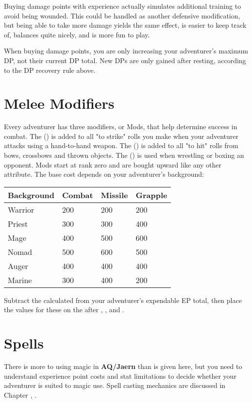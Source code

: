 \begin{multicols*}{2}
Buying damage points with experience actually simulates additional training to avoid being wounded. This could be handled as another defensive modification, but being able to take more damage yields the same effect, is easier to keep track of, balances quite nicely, and is more fun to play.

When buying damage points, you are only increasing your adventurer's maximum DP, not their current DP total. New DPs are only gained after resting, according to the DP recovery rule above.
\section{Melee Modifiers}
Every adventurer has three modifiers, or Mods, that help determine success in combat. The  (\CM) is added to all  "to strike" rolls you make when your adventurer attacks using a hand-to-hand weapon. The  (\MM) is added to all "to hit" rolls from bows, crossbows and thrown objects. The  (\GM) is used when wrestling or boxing an opponent. Mods start at rank zero and are bought upward like any other attribute. The base cost depends on your adventurer's background:

\begin{normbox}
\begin{tabular}{l l l l}
\small
\textbf{Background} & \textbf{Combat} & \textbf{Missile} & \textbf{Grapple}\\
\midrule
Warrior & 200 & 200 & 200\\
Priest & 300 & 300 & 400\\
Mage & 400 & 500 & 600\\
Nomad & 500 & 600 & 500\\
Auger & 400 & 400 & 400\\
Marine & 300 & 400 & 200\\
\end{tabular}
\end{normbox}
\normalsize
Subtract the calculated \EP from your adventurer's expendable EP total, then place the values for these on the  after , , and .
\section{Spells}
There is more to using magic in \textbf{AQ/Jaern} than is given here, but you need to understand experience point costs and stat limitations to decide whether your adventurer is suited to magic use. Spell casting mechanics are discussed in Chapter \textbf{}, \tcpage{\pageref{ch:play-adventurer}}.


\end{multicols*}
